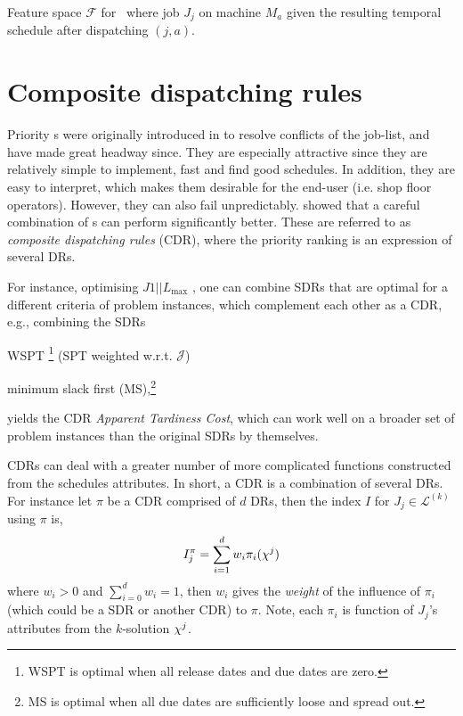 \begin{table} \centering 
    \caption[Feature space $\mathcal{F}$ for \JSP]{Feature space $\mathcal{F}$ 
        for \JSP\ where job $J_j$ on machine $M_a$ given the resulting temporal 
        schedule after dispatching $(j,a)$.}
    \label{tbl:features}
    
\end{table}

\section{Composite dispatching rules}\label{sec:CDR}

Priority \dr s were originally introduced in \citet{Giffler60} to resolve 
conflicts of the job-list, and have made great headway since. 
They are especially attractive since they are relatively simple to 
implement, fast and find good schedules. In addition, they are easy 
to interpret, which makes them desirable for the end-user (i.e. shop floor 
operators). 
However, they can also fail unpredictably. 
\citet{Jayamohan04} showed that a careful combination of \dr s can 
perform significantly better. These are referred to as \emph{composite 
dispatching rules} (CDR), where the priority ranking is an expression of 
several DRs. 

For instance, optimising $J1||L_{\max}$ \cite[see. chapter 14.2]{Pinedo08}, one 
can combine SDRs that are optimal for a different criteria of problem 
instances, which complement each other as a CDR, e.g., combining the SDRs 
\begin{enumerate*}[after={{}}]
    \item WSPT \footnote{WSPT is optimal when all release dates and due dates 
        are zero.} (SPT weighted w.r.t. $\mathcal{J}$)
    \item minimum slack first (MS),\footnote{MS is optimal when all due dates 
        are sufficiently loose and spread out.} 
\end{enumerate*}
yields the CDR \emph{Apparent Tardiness Cost}, which can work well on a 
broader set of problem instances than the original SDRs by themselves.


CDRs can deal with a greater number of more complicated functions constructed 
from the schedules attributes. In short, a CDR is a combination of several DRs. 
For instance let $\pi$ be a CDR comprised of $d$ DRs, then the index $I$ for 
$J_j\in\mathcal{L}^{(k)}$ using $\pi$ is, 
\begin{equation}
I_j^{\pi} = \sum_{i=1}^d w_i \pi_i(\vchi^j) \label{eq:CDR}
\end{equation}
where $w_i>0$ and $\sum_{i=0}^d w_i = 1$, then $w_i$ gives the \emph{weight} of 
the influence of $\pi_i$ (which could be a SDR or another CDR) to $\pi$. Note, 
each $\pi_i$ is function of $J_j$'s attributes from the $k$-solution ${\mathbf{\chi}}^j$.

